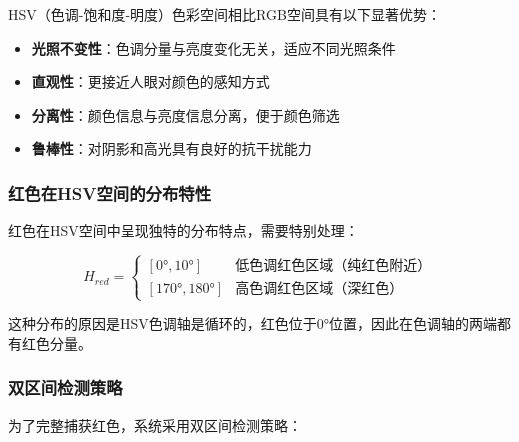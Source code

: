 \documentclass[12pt]{article}
\begin{document}
HSV（色调-饱和度-明度）色彩空间相比RGB空间具有以下显著优势：

\begin{itemize}
    \item \textbf{光照不变性}：色调分量与亮度变化无关，适应不同光照条件
    \item \textbf{直观性}：更接近人眼对颜色的感知方式
    \item \textbf{分离性}：颜色信息与亮度信息分离，便于颜色筛选
    \item \textbf{鲁棒性}：对阴影和高光具有良好的抗干扰能力
\end{itemize}

\subsubsection{红色在HSV空间的分布特性}

红色在HSV空间中呈现独特的分布特点，需要特别处理：

\begin{equation}
H_{red} = \begin{cases}
[0°, 10°] & \text{低色调红色区域（纯红色附近）} \\
[170°, 180°] & \text{高色调红色区域（深红色）}
\end{cases}
\end{equation}

这种分布的原因是HSV色调轴是循环的，红色位于0°位置，因此在色调轴的两端都有红色分量。

\subsubsection{双区间检测策略}

为了完整捕获红色，系统采用双区间检测策略：
\end{document}
